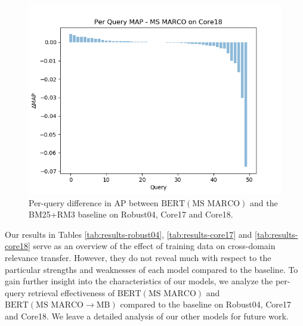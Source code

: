 \begin{figure}[t!]
\begin{minipage}{0.33\textwidth}
        \includegraphics[width=\textwidth]{figures/perquery12.png}
    \end{minipage}
\caption{Per-query difference in AP between $ \textrm{BERT}(\textrm{MS MARCO}) $ and the BM25+RM3 baseline on Robust04, Core17 and Core18.}
\label{fig:perquery-msmarco} 
\end{figure}


Our results in Tables \ref{tab:results-robust04}, \ref{tab:results-core17} and \ref{tab:results-core18} serve as an overview of the effect of training data on cross-domain relevance transfer.
However, they do not reveal much with respect to the particular strengths and weaknesses of each model compared to the baseline.
To gain further insight into the characteristics of our models, we analyze the per-query retrieval effectiveness of $ \textrm{BERT}(\textrm{MS MARCO}) $ and $ \textrm{BERT}(\textrm{MS MARCO}\rightarrow\textrm{MB}) $ compared to the baseline on Robust04, Core17 and Core18.
We leave a detailed analysis of our other models for future work.

